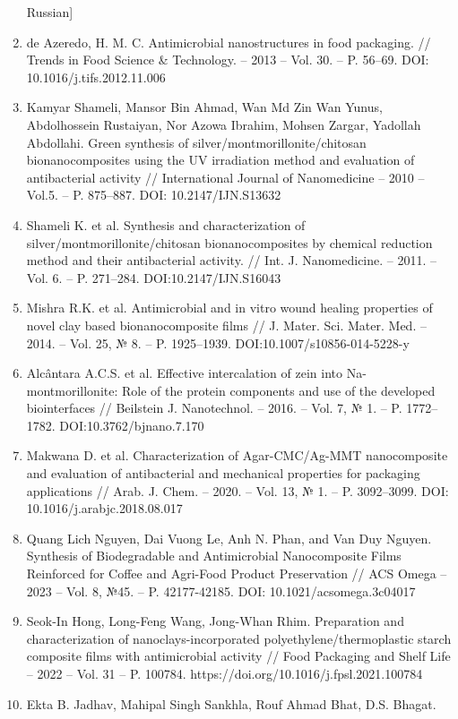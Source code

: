 \begin{enumerate}
  Russian{]}
\item
  de Azeredo, H. M. C. Antimicrobial nanostructures in food packaging.
  // Trends in Food Science \& Technology. -- 2013 -- Vol. 30. -- P.
  56--69. DOI: 10.1016/j.tifs.2012.11.006
\item
  Kamyar Shameli, Mansor Bin Ahmad, Wan Md Zin Wan Yunus, Abdolhossein
  Rustaiyan, Nor Azowa Ibrahim, Mohsen Zargar, Yadollah Abdollahi. Green
  synthesis of silver/montmorillonite/chitosan bionanocomposites using
  the UV irradiation method and evaluation of antibacterial activity //
  International Journal of Nanomedicine -- 2010 -- Vol.5. -- P.
  875--887. DOI: 10.2147/IJN.S13632
\item
  Shameli K. et al. Synthesis and characterization of
  silver/montmorillonite/chitosan bionanocomposites by chemical
  reduction method and their antibacterial activity. // Int. J.
  Nanomedicine. -- 2011. -- Vol. 6. -- P. 271--284.
  DOI:10.2147/IJN.S16043
\item
  Mishra R.K. et al. Antimicrobial and in vitro wound healing properties
  of novel clay based bionanocomposite films // J. Mater. Sci. Mater.
  Med. -- 2014. -- Vol. 25, № 8. -- P. 1925--1939.
  DOI:10.1007/s10856-014-5228-y
\item
  Alcântara A.C.S. et al. Effective intercalation of zein into
  Na-montmorillonite: Role of the protein components and use of the
  developed biointerfaces // Beilstein J. Nanotechnol. -- 2016. -- Vol.
  7, № 1. -- P. 1772--1782. DOI:10.3762/bjnano.7.170
\item
  Makwana D. et al. Characterization of Agar-CMC/Ag-MMT nanocomposite
  and evaluation of antibacterial and mechanical properties for
  packaging applications // Arab. J. Chem. -- 2020. -- Vol. 13, № 1. --
  P. 3092--3099. DOI: 10.1016/j.arabjc.2018.08.017
\item
  Quang Lich Nguyen, Dai Vuong Le, Anh N. Phan, and Van Duy Nguyen.
  Synthesis of Biodegradable and Antimicrobial Nanocomposite Films
  Reinforced for Coffee and Agri-Food Product Preservation // ACS Omega
  -- 2023 -- Vol. 8, №45. -- P. 42177-42185. DOI:
  10.1021/acsomega.3c04017
\item
  Seok-In Hong, Long-Feng Wang, Jong-Whan Rhim. Preparation and
  characterization of nanoclays-incorporated polyethylene/thermoplastic
  starch composite films with antimicrobial activity // Food Packaging
  and Shelf Life -- 2022 -- Vol. 31 -- P. 100784.
  https://doi.org/10.1016/j.fpsl.2021.100784
\item
  Ekta B. Jadhav, Mahipal Singh Sankhla, Rouf Ahmad Bhat, D.S. Bhagat.

\end{enumerate}
